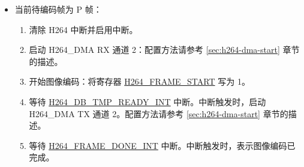\documentclass[main\_\_CN.tex]{subfiles}
\begin{document}
\begin{enumerate}
\begin{itemize}
\begin{enumerate}
            \item 启动 H264\_DMA RX 通道 4：请参考 \ref{sec:h264-dma-start} 章节进行配置。
            \item 清除 H264 中断并启用中断。
            \item 开始图像编码：将寄存器 \hyperref[fielddesc:H264FRAMESTART]{H264\_FRAME\_START} 写为 1。
            \item 等待 \hyperref[int:H264DBTMPREADYINT]{H264\_DB\_TMP\_READY\_INT} 中断。中断触发后，启动 H264\_DMA TX 通道 2。请参考 \ref{sec:h264-dma-start} 章节进行配置。
            \item 等待 \hyperref[int:H264RECREADYINT]{H264\_REC\_READY\_INT} 中断。中断触发后，启动 H264\_DMA RX 通道 5 并启动 H264\_DMA TX 通道 3 和 TX 通道 4。请参考 \ref{sec:h264-dma-start} 章节进行配置。
            \item 启动 H264\_DMA 将参考图像从外部存储移动到内部存储：将寄存器 \hyperref[fielddesc:H264DMAMOVESTART]{H264\_DMA\_MOVE\_START} 写为 1。
            \item 等待 \hyperref[int:H264DMAMOVE2MBLINEDONEINT]{H264\_DMA\_MOVE\_2MB\_LINE\_DONE\_INT} 中断。中断触发后，启动 H264\_DMA TX 通道 1。配置方法请参考 \ref{sec:h264-dma-start} 章节的描述。
            \item 等待 \hyperref[int:H264FRAMEDONEINT]{H264\_FRAME\_DONE\_INT} 中断。中断触发表示图像的编码已完成。
            \item 重置 H264\_DMA TX 通道 2 和 RX 通道 2：配置方法请参考 \ref{sec:h264-dma-reset} 章节的描述。
            \item 重置 H264\_DMA 中解块滤波器中间数据的读写次数计数器：将寄存器 \hyperref[fielddesc:H264DMARXCH2INTERCOUNTERRST]{H264\_DMA\_RX\_CH2\_INTER\_COUNTER\_RST} 设置为 1，然后设置为 0。
        \end{enumerate}
        \item 当前待编码帧为 P 帧：
        \begin{enumerate}
            \item 清除 H264 中断并启用中断。
            \item 启动 H264\_DMA RX 通道 2：配置方法请参考 \ref{sec:h264-dma-start} 章节的描述。
            \item 开始图像编码：将寄存器 \hyperref[fielddesc:H264FRAMESTART]{H264\_FRAME\_START} 写为 1。
            \item 等待 \hyperref[int:H264DBTMPREADYINT]{H264\_DB\_TMP\_READY\_INT} 中断。中断触发时，启动 H264\_DMA TX 通道 2。配置方法请参考 \ref{sec:h264-dma-start} 章节的描述。
            \item 等待 \hyperref[int:H264FRAMEDONEINT]{H264\_FRAME\_DONE\_INT} 中断。中断触发时，表示图像编码已完成。

\end{enumerate}
\end{itemize}
\end{enumerate}
\end{document}
